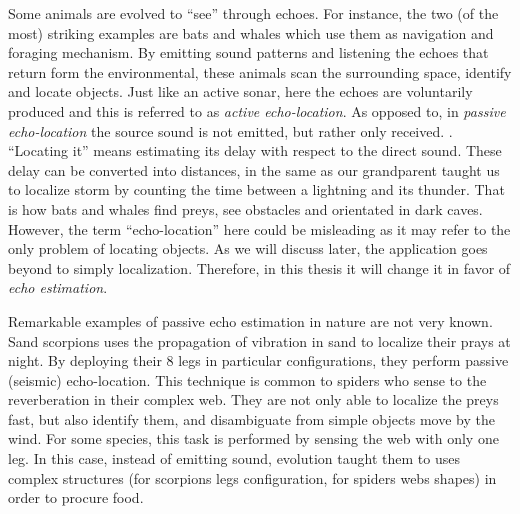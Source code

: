 \mynewline
Some animals are evolved to ``see'' through echoes.
For instance, the two (of the most) striking examples are bats and whales which use them as navigation and foraging mechanism.
By emitting sound patterns and listening the echoes that return form the environmental, these animals scan the surrounding space, identify and locate objects.
Just like an active sonar, here the echoes are voluntarily produced and this is referred to as \textit{active echo-location}.
As opposed to, in \textit{passive echo-location} the source sound is not emitted, but rather only received.
.
``Locating it'' means estimating its delay with respect to the direct sound.
These delay can be converted into distances, in the same as our grandparent taught us to localize storm by counting the time between a lightning and its thunder.
That is how bats and whales find preys, see obstacles and orientated in dark caves.
However, the term ``echo-location'' here could be misleading as it may refer to the only problem of locating objects.
As we will discuss later, the application goes beyond to simply localization.
Therefore, in this thesis it will change it in favor of \textit{echo estimation}.

\mynewline
Remarkable examples of passive echo estimation in nature are not very known.
Sand scorpions uses the propagation of vibration in sand to localize their prays at night.
By deploying their 8 legs in particular configurations, they perform passive (seismic) echo-location.
This technique is common to spiders who sense to the reverberation in their complex web.
They are not only able to localize the preys fast, but also identify them, and disambiguate from simple objects move by the wind.
For some species, this task is performed by sensing the web with only one leg.
In this case, instead of emitting sound, evolution taught them to uses complex structures (for scorpions legs configuration, for spiders webs shapes)
in order to procure food.

